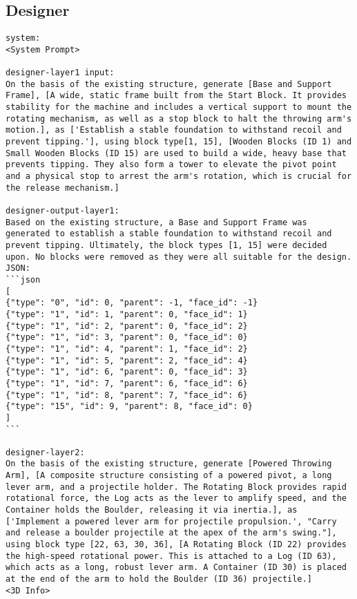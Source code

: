 \subsection{Designer}
\begin{lstlisting}
system:
<System Prompt>

designer-layer1 input:
On the basis of the existing structure, generate [Base and Support Frame], [A wide, static frame built from the Start Block. It provides stability for the machine and includes a vertical support to mount the rotating mechanism, as well as a stop block to halt the throwing arm's motion.], as ['Establish a stable foundation to withstand recoil and prevent tipping.'], using block type[1, 15], [Wooden Blocks (ID 1) and Small Wooden Blocks (ID 15) are used to build a wide, heavy base that prevents tipping. They also form a tower to elevate the pivot point and a physical stop to arrest the arm's rotation, which is crucial for the release mechanism.]

designer-output-layer1:
Based on the existing structure, a Base and Support Frame was generated to establish a stable foundation to withstand recoil and prevent tipping. Ultimately, the block types [1, 15] were decided upon. No blocks were removed as they were all suitable for the design.
JSON:
```json
[
{"type": "0", "id": 0, "parent": -1, "face_id": -1}
{"type": "1", "id": 1, "parent": 0, "face_id": 1}
{"type": "1", "id": 2, "parent": 0, "face_id": 2}
{"type": "1", "id": 3, "parent": 0, "face_id": 0}
{"type": "1", "id": 4, "parent": 1, "face_id": 2}
{"type": "1", "id": 5, "parent": 2, "face_id": 4}
{"type": "1", "id": 6, "parent": 0, "face_id": 3}
{"type": "1", "id": 7, "parent": 6, "face_id": 6}
{"type": "1", "id": 8, "parent": 7, "face_id": 6}
{"type": "15", "id": 9, "parent": 8, "face_id": 0}
]
```

designer-layer2:
On the basis of the existing structure, generate [Powered Throwing Arm], [A composite structure consisting of a powered pivot, a long lever arm, and a projectile holder. The Rotating Block provides rapid rotational force, the Log acts as the lever to amplify speed, and the Container holds the Boulder, releasing it via inertia.], as ['Implement a powered lever arm for projectile propulsion.', "Carry and release a boulder projectile at the apex of the arm's swing."], using block type [22, 63, 30, 36], [A Rotating Block (ID 22) provides the high-speed rotational power. This is attached to a Log (ID 63), which acts as a long, robust lever arm. A Container (ID 30) is placed at the end of the arm to hold the Boulder (ID 36) projectile.]
<3D Info>


\end{lstlisting}
